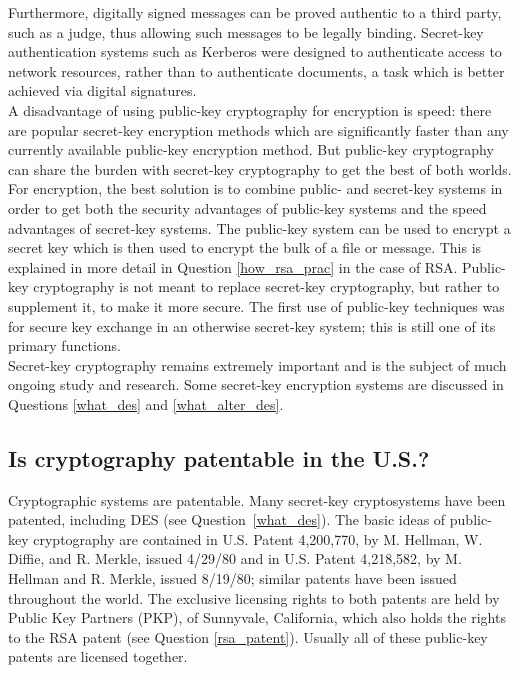 Furthermore, digitally signed messages can be proved authentic to a
third party, such as a judge, thus allowing such messages to be legally
binding. Secret-key authentication systems such as Kerberos were
designed to authenticate access to network resources, rather than to
authenticate documents, a task which is better achieved via digital
signatures.\\

A disadvantage of using public-key cryptography for encryption is
speed: there are popular secret-key encryption methods which are
significantly faster than any currently available public-key encryption
method. But public-key cryptography can share the burden with
secret-key cryptography to get the best of both worlds.\\

For encryption, the best solution is to combine public- and secret-key
systems in order to get both the security advantages of public-key systems
and the speed advantages of secret-key systems. The public-key system can
be used to encrypt a secret key which is then used to encrypt the bulk of a
file or message. This is explained in more detail in Question
\ref{how_rsa_prac} in the case of RSA. Public-key cryptography is not meant
to replace secret-key cryptography, but rather to supplement it, to make it
more secure. The first use of public-key techniques was for secure key
exchange in an otherwise secret-key system; this is still one of its
primary functions.\\

Secret-key cryptography remains extremely important and is the subject
of much ongoing study and research. Some secret-key encryption systems
are discussed in Questions \ref{what_des} and \ref{what_alter_des}.

\subsection{Is cryptography patentable in the U.S.?}
\label{cryp_paten}

Cryptographic systems are patentable. Many secret-key cryptosystems have
been patented, including DES (see Question~\ref{what_des}). The basic ideas
of public-key cryptography are contained in U.S. Patent 4,200,770, by M.
Hellman, W. Diffie, and R. Merkle, issued 4/29/80 and in U.S. Patent
4,218,582, by M. Hellman and R. Merkle, issued 8/19/80; similar patents
have been issued throughout the world. The exclusive licensing rights to
both patents are held by Public Key Partners (PKP), of Sunnyvale,
California, which also holds the rights to the RSA patent (see Question
\ref{rsa_patent}). Usually all of these public-key patents are licensed
together.\\

